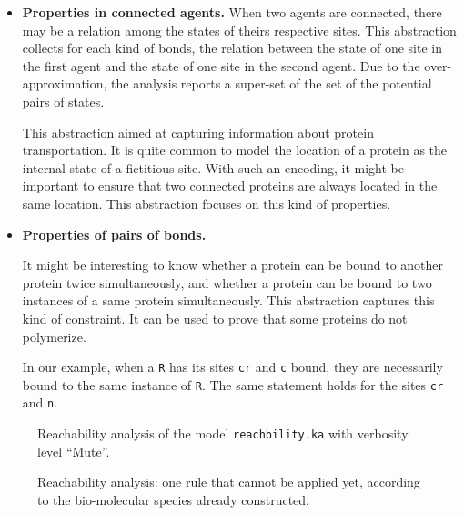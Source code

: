 \documentclass[11pt]{book}
\begin{document}
\begin{itemize}
\item \textbf{Properties in connected agents.}
When two agents are connected, there may be a relation among the states of theirs respective sites.  This abstraction \cite{Feret:SASB2016} collects for each kind of bonds, the relation between the state of one site in the first agent and the state of one site in the second agent.  Due to the over-approximation, the analysis reports a super-set of the set of the potential pairs of states.

This abstraction aimed at capturing information about protein transportation.
It is quite common to model the location of a protein as the internal state of  a fictitious site. With such an encoding, it might be important to ensure that two connected proteins are always located in the same location. This abstraction focuses on this kind of properties.

\item \textbf{Properties of pairs of bonds.}

It might be interesting to know whether a protein can be bound to another protein twice simultaneously, and whether a protein can be bound to two instances of a same protein simultaneously. This abstraction \cite{Feret:SASB2016} captures this kind of constraint. It can be used to prove that some proteins do not polymerize.

In our example, when a \texttt{R} has its sites \texttt{cr} and \texttt{c} bound, they are necessarily bound to the same instance of \texttt{R}. The same statement holds for the sites \texttt{cr} and \texttt{n}.
\end{itemize}




\begin{figure}[t]

\caption{Reachability analysis of the model \texttt{reachbility.ka} with verbosity level ``Mute''.}
\label{fig:reachability_mute}
\end{figure}
%
\begin{figure}[t]

\caption{Reachability analysis: one rule that cannot be applied yet, according to the bio-molecular species already constructed.}
\label{fig:reachability_medium_ko}
\end{figure}
\end{document}
